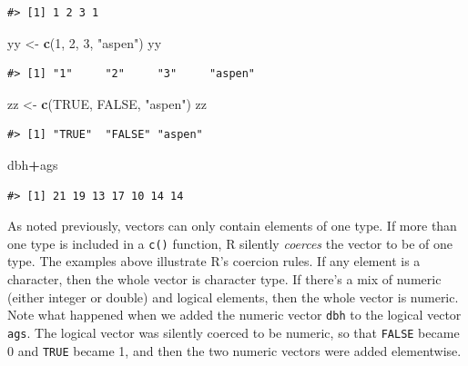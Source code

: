 \documentclass[
  11pt,
]{krantz}
\newenvironment{Shaded}{\begin{snugshade}}{\end{snugshade}}
\newcommand{\DecValTok}[1]{\textcolor[rgb]{0.00,0.00,0.81}{#1}}
\newcommand{\KeywordTok}[1]{\textcolor[rgb]{0.13,0.29,0.53}{\textbf{#1}}}
\newcommand{\NormalTok}[1]{#1}
\newcommand{\OperatorTok}[1]{\textcolor[rgb]{0.81,0.36,0.00}{\textbf{#1}}}
\newcommand{\OtherTok}[1]{\textcolor[rgb]{0.56,0.35,0.01}{#1}}
\newcommand{\StringTok}[1]{\textcolor[rgb]{0.31,0.60,0.02}{#1}}
\theoremstyle{definition}
\theoremstyle{definition}
\theoremstyle{definition}
\theoremstyle{definition}
\theoremstyle{remark}
\begin{document}
\begin{verbatim}
#> [1] 1 2 3 1
\end{verbatim}

\begin{Shaded}
\begin{Highlighting}[]
\NormalTok{yy \textless{}{-}}\StringTok{ }\KeywordTok{c}\NormalTok{(}\DecValTok{1}\NormalTok{, }\DecValTok{2}\NormalTok{, }\DecValTok{3}\NormalTok{, }\StringTok{"aspen"}\NormalTok{)}
\NormalTok{yy}
\end{Highlighting}
\end{Shaded}

\begin{verbatim}
#> [1] "1"     "2"     "3"     "aspen"
\end{verbatim}

\begin{Shaded}
\begin{Highlighting}[]
\NormalTok{zz \textless{}{-}}\StringTok{ }\KeywordTok{c}\NormalTok{(}\OtherTok{TRUE}\NormalTok{, }\OtherTok{FALSE}\NormalTok{, }\StringTok{"aspen"}\NormalTok{)}
\NormalTok{zz}
\end{Highlighting}
\end{Shaded}

\begin{verbatim}
#> [1] "TRUE"  "FALSE" "aspen"
\end{verbatim}

\begin{Shaded}
\begin{Highlighting}[]
\NormalTok{dbh}\OperatorTok{+}\NormalTok{ags}
\end{Highlighting}
\end{Shaded}

\begin{verbatim}
#> [1] 21 19 13 17 10 14 14
\end{verbatim}

As noted previously, vectors can only contain elements of one type. If more than one type is included in a \texttt{c()} function, R silently \emph{coerces} the vector to be of one type. The examples above illustrate R's coercion rules. If any element is a character, then the whole vector is character type. If there's a mix of numeric (either integer or double) and logical elements, then the whole vector is numeric. Note what happened when we added the numeric vector \texttt{dbh} to the logical vector \texttt{ags}. The logical vector was silently coerced to be numeric, so that \texttt{FALSE} became 0 and \texttt{TRUE} became 1, and then the two numeric vectors were added elementwise.
\end{document}
